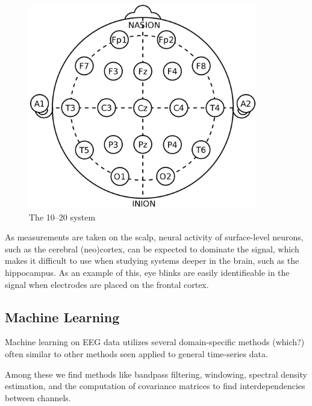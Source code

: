     \begin{figure}
        \begin{center}
            \includegraphics[width=10cm]{img/1020 system.png}
        \end{center}
        \caption{The 10–20 system}\label{fig:1020}
    \end{figure}


    As measurements are taken on the scalp, neural activity of surface-level neurons, such as the cerebral (neo)cortex, can be expected to dominate the signal, which makes it difficult to use when studying systems deeper in the brain, such as the hippocampus. As an example of this, eye blinks are easily identifieable in the signal when electrodes are placed on the frontal cortex.



\subsection{Machine Learning}

    Machine learning on EEG data utilizes several domain-specific methods (which?) often similar to other methods seen applied to general time-series data.

    Among these we find methods like bandpass filtering, windowing, spectral density estimation, and the computation of covariance matrices to find interdependencies between channels.

